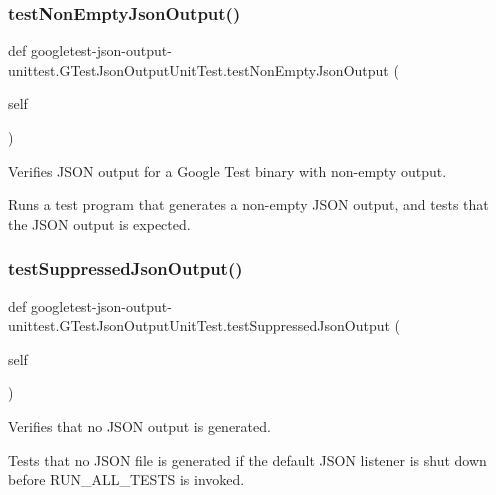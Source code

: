 \subsubsection{\texorpdfstring{testNonEmptyJsonOutput()}{testNonEmptyJsonOutput()}}
{\footnotesize\ttfamily def googletest-\/json-\/output-\/unittest.\+G\+Test\+Json\+Output\+Unit\+Test.\+test\+Non\+Empty\+Json\+Output (\begin{DoxyParamCaption}\item[{}]{self }\end{DoxyParamCaption})}

\begin{DoxyVerb}Verifies JSON output for a Google Test binary with non-empty output.

Runs a test program that generates a non-empty JSON output, and
tests that the JSON output is expected.
\end{DoxyVerb}
 \mbox{\label{classgoogletest-json-output-unittest_1_1GTestJsonOutputUnitTest_aeae00520b90ff69e832cf6a676219cf8}} 
\subsubsection{\texorpdfstring{testSuppressedJsonOutput()}{testSuppressedJsonOutput()}}
{\footnotesize\ttfamily def googletest-\/json-\/output-\/unittest.\+G\+Test\+Json\+Output\+Unit\+Test.\+test\+Suppressed\+Json\+Output (\begin{DoxyParamCaption}\item[{}]{self }\end{DoxyParamCaption})}

\begin{DoxyVerb}Verifies that no JSON output is generated.

Tests that no JSON file is generated if the default JSON listener is
shut down before RUN_ALL_TESTS is invoked.
\end{DoxyVerb}
 \mbox{\label{classgoogletest-json-output-unittest_1_1GTestJsonOutputUnitTest_afceaa6545170996b286e610e31f2e403}} 
